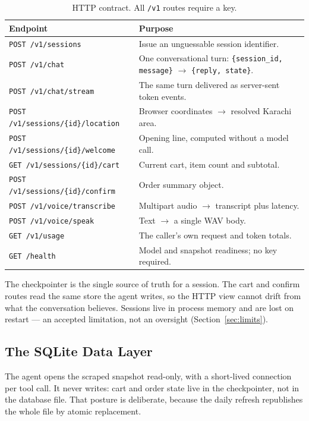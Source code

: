 \documentclass[11pt,a4paper]{article}
\newcommand{\code}[1]{\texttt{\small #1}}
\begin{document}
\begin{table}[htbp]
\centering
\caption{HTTP contract. All \code{/v1} routes require a key.}
\label{tab:routes}
\small
\begin{tabularx}{\textwidth}{@{}l X@{}}
\toprule
\textbf{Endpoint} & \textbf{Purpose} \\
\midrule
\code{POST /v1/sessions} & Issue an unguessable session identifier. \\
\code{POST /v1/chat} & One conversational turn: \code{\{session\_id, message\}} $\rightarrow$ \code{\{reply, state\}}. \\
\code{POST /v1/chat/stream} & The same turn delivered as server-sent token events. \\
\code{POST /v1/sessions/\{id\}/location} & Browser coordinates $\rightarrow$ resolved Karachi area. \\
\code{POST /v1/sessions/\{id\}/welcome} & Opening line, computed without a model call. \\
\code{GET /v1/sessions/\{id\}/cart} & Current cart, item count and subtotal. \\
\code{POST /v1/sessions/\{id\}/confirm} & Order summary object. \\
\code{POST /v1/voice/transcribe} & Multipart audio $\rightarrow$ transcript plus latency. \\
\code{POST /v1/voice/speak} & Text $\rightarrow$ a single WAV body. \\
\code{GET /v1/usage} & The caller's own request and token totals. \\
\code{GET /health} & Model and snapshot readiness; no key required. \\
\bottomrule
\end{tabularx}
\end{table}

The checkpointer is the single source of truth for a session. The cart and
confirm routes read the same store the agent writes, so the HTTP view cannot
drift from what the conversation believes. Sessions live in process memory and
are lost on restart --- an accepted limitation, not an oversight
(Section~\ref{sec:limits}).

\subsection{The SQLite Data Layer}

The agent opens the scraped snapshot read-only, with a short-lived connection
per tool call. It never writes: cart and order state live in the checkpointer,
not in the database file. That posture is deliberate, because the daily
refresh republishes the whole file by atomic replacement.
\end{document}
